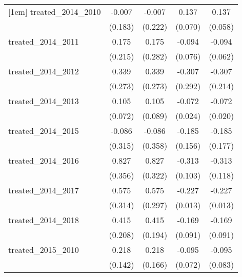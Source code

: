 {\begin{tabular}{l*{4}{c}}
[1em]
treated\_2014\_2010&      -0.007         &      -0.007         &       0.137         &       0.137\sym{*}  \\
            &     (0.183)         &     (0.222)         &     (0.070)         &     (0.058)         \\
[1em]
treated\_2014\_2011&       0.175         &       0.175         &      -0.094         &      -0.094         \\
            &     (0.215)         &     (0.282)         &     (0.076)         &     (0.062)         \\
[1em]
treated\_2014\_2012&       0.339         &       0.339         &      -0.307         &      -0.307         \\
            &     (0.273)         &     (0.273)         &     (0.292)         &     (0.214)         \\
[1em]
treated\_2014\_2013&       0.105         &       0.105         &      -0.072\sym{**} &      -0.072\sym{***}\\
            &     (0.072)         &     (0.089)         &     (0.024)         &     (0.020)         \\
[1em]
treated\_2014\_2015&      -0.086         &      -0.086         &      -0.185         &      -0.185         \\
            &     (0.315)         &     (0.358)         &     (0.156)         &     (0.177)         \\
[1em]
treated\_2014\_2016&       0.827\sym{*}  &       0.827\sym{*}  &      -0.313\sym{**} &      -0.313\sym{**} \\
            &     (0.356)         &     (0.322)         &     (0.103)         &     (0.118)         \\
[1em]
treated\_2014\_2017&       0.575         &       0.575         &      -0.227\sym{***}&      -0.227\sym{***}\\
            &     (0.314)         &     (0.297)         &     (0.013)         &     (0.013)         \\
[1em]
treated\_2014\_2018&       0.415\sym{*}  &       0.415\sym{*}  &      -0.169         &      -0.169         \\
            &     (0.208)         &     (0.194)         &     (0.091)         &     (0.091)         \\
[1em]
treated\_2015\_2010&       0.218         &       0.218         &      -0.095         &      -0.095         \\
            &     (0.142)         &     (0.166)         &     (0.072)         &     (0.083)         \\

\end{tabular}}
